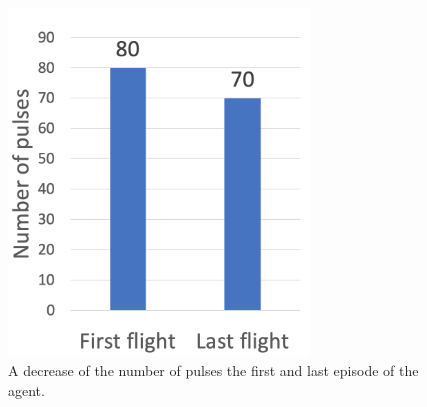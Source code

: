 \documentclass[../main]{subfiles}
\begin{document}
\newpage
{}
\begin{figure}[H]
  \centering
  \vfill
  \includegraphics[width=8cm]{figures/agent_pulses.png}
  \caption{
    A decrease of the number of pulses 
    the first and last episode of the agent.
  }\label{fig:agent_pulse}
\end{figure}
\end{document}
